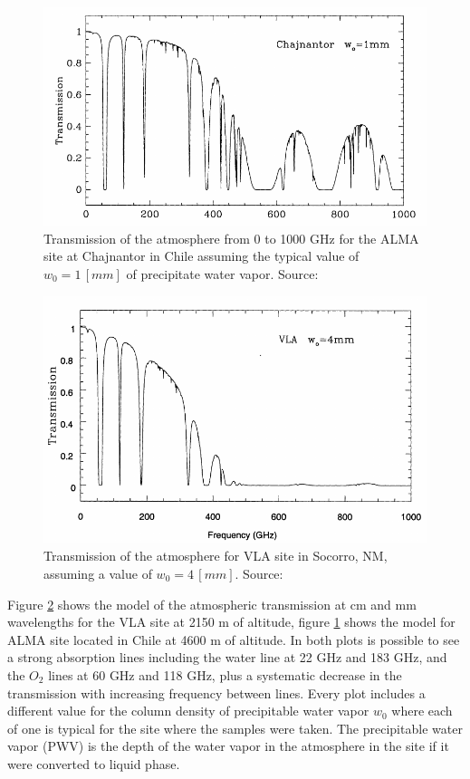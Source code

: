 \begin{figure}[]
\includegraphics[width=\textwidth]{images/chajnantor-atm-transmission}
\caption[Transmission of the atmosphere from 0 to 1000 GHz for the ALMA site at Chajnantor in Chile]{Transmission of the atmosphere from 0 to 1000 GHz for the ALMA site at Chajnantor in Chile assuming the typical value of $w_0 = 1\,[mm]$ of precipitate water vapor. Source: \cite{taylor99}}
\label{fig:chaj-atm-tx}
\end{figure}

\begin{figure}[]
\includegraphics[width=\textwidth]{images/vla-atm-transmission}
\caption[Transmission of the atmosphere for VLA site in Socorro, NM]{Transmission of the atmosphere for VLA site in Socorro, NM, assuming a value of $w_0 = 4\,[mm]$. Source: \cite{taylor99}}
\label{fig:vla-atm-tx}
\end{figure}

Figure \ref{fig:vla-atm-tx} shows the model of the atmospheric transmission at cm and mm wavelengths for the VLA site at 2150 m of altitude, figure \ref{fig:chaj-atm-tx} shows the model for ALMA site located in Chile at 4600 m of altitude. In both plots is possible to see a strong absorption lines including the water line at 22 GHz and 183 GHz, and the $O_2$ lines at 60 GHz and 118 GHz, plus a systematic decrease in the transmission with increasing frequency between lines. Every plot includes a different value for the column density of precipitable water vapor $w_0$ where each of one is typical for the site where the samples were taken. The precipitable water vapor (PWV) is the depth of the water vapor in the atmosphere in the site if it were converted to liquid phase.

